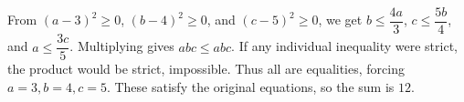 From $(a-3)^2\ge0$, $(b-4)^2\ge0$, and $(c-5)^2\ge0$, we get $b\le\dfrac{4a}{3}$, $c\le\dfrac{5b}{4}$, and $a\le\dfrac{3c}{5}$. Multiplying gives $abc\le abc$. If any individual inequality were strict, the product would be strict, impossible. Thus all are equalities, forcing $a=3,b=4,c=5$. These satisfy the original equations, so the sum is $\boxed{12}$.
